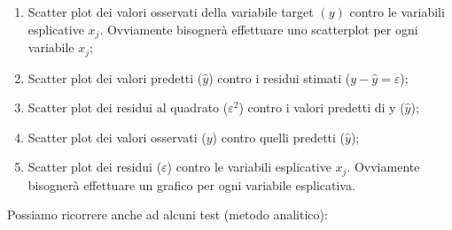 \documentclass[a4page, 11pt]{article} %
\begin{document}
\begin{enumerate}[noitemsep]
\item Scatter plot dei valori osservati della variabile target $(y)$ contro le variabili esplicative $x_j$. Ovviamente bisognerà effettuare uno scatterplot per ogni variabile $x_j$;
\item Scatter plot dei valori predetti ($\hat{y}$) contro i residui stimati ($y - \hat{y} = \varepsilon$);
\item Scatter plot dei residui al quadrato ($\varepsilon^2$) contro i valori predetti di y ($\hat{y}$);
\item Scatter plot dei valori osservati ($y$) contro quelli predetti ($\hat{y}$);
\item Scatter plot dei residui ($\varepsilon$) contro le variabili esplicative $x_j$. Ovviamente bisognerà effettuare un grafico per ogni variabile esplicativa.
\end{enumerate}
Possiamo ricorrere anche ad alcuni test (metodo analitico):
\end{document}
